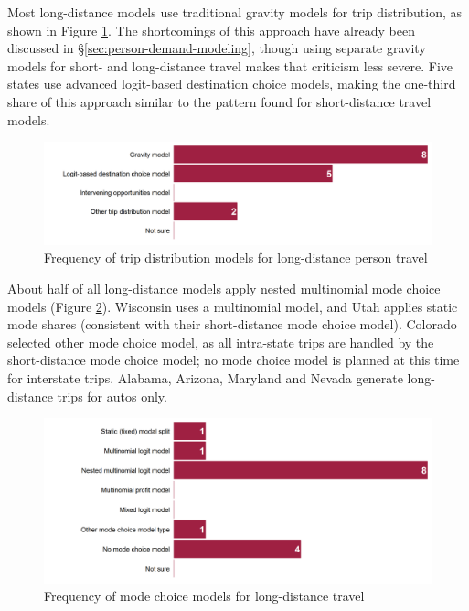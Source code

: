 Most long-distance models use traditional gravity models for trip distribution, as shown in Figure \ref{fig:person-long-distance-distribution}. The shortcomings of this approach have already been discussed in \S\ref{sec:person-demand-modeling}, though using separate gravity models for short- and long-distance travel makes that criticism less severe. Five states use advanced logit-based destination choice models, making the one-third share of this approach similar to the pattern found for short-distance travel models.

\begin{figure}   %
\centering
\includegraphics[width=6.4in]{graphics/19-person-long-distance-distribution}
\caption{Frequency of trip distribution models for long-distance person travel}
\label{fig:person-long-distance-distribution}
\end{figure}

About half of all long-distance models apply nested multinomial mode choice models (Figure \ref{fig:person-long-distance-mode-choice}). Wisconsin uses a multinomial model, and Utah applies static mode shares (consistent with their short-distance mode choice model). Colorado selected other mode choice model, as all intra-state trips are handled by the short-distance mode choice model; no mode choice model is planned at this time for interstate trips. Alabama, Arizona, Maryland and Nevada generate long-distance trips for autos only.

\begin{figure}   %
\centering
\includegraphics[width=6.4in]{graphics/20-person-long-distance-mode-choice}
\caption{Frequency of mode choice models for long-distance travel}
\label{fig:person-long-distance-mode-choice}
\end{figure}

